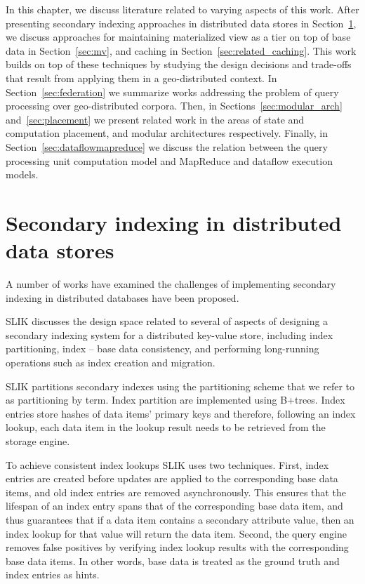 In this chapter, we discuss literature related to varying aspects of this work.
After presenting secondary indexing approaches in distributed data stores in Section~\ref{sec:secondaryindexing},
we discuss approaches for maintaining materialized view as a tier on top of base data in Section~\ref{sec:mv},
and caching in Section~\ref{sec:related_caching}.
This work builds on top of these techniques by studying the design decisions and trade-offs that result from applying
them in a geo-distributed context.
In Section~\ref{sec:federation} we summarize works addressing the problem of query processing over geo-distributed corpora.
Then, in Sections~\ref{sec:modular_arch} and~\ref{sec:placement}
we present related work in the areas of state and computation placement, and modular architectures respectively.
Finally, in Section~\ref{sec:dataflowmapreduce} we discuss the relation between the query processing unit computation model
and MapReduce and dataflow execution models.


\section{Secondary indexing in distributed data stores}
\label{sec:secondaryindexing}

A number of works \cite{kejriwal:slik, dsilva:tworings, tan:diffindex, tang:deferredindexing}
have examined the challenges of implementing secondary indexing in distributed databases have been proposed.

SLIK \cite{kejriwal:slik} discusses the design space related to several of aspects of designing a secondary indexing system
for a distributed key-value store, including index partitioning, index -- base data consistency,
and performing long-running operations such as index creation and migration.

SLIK partitions secondary indexes using the partitioning scheme that we refer to as partitioning by term.
Index partition are implemented using B+trees.
Index entries store hashes of data items' primary keys and therefore,
following an index lookup, each data item in the lookup result needs to be retrieved from the storage engine.

To achieve consistent index lookups SLIK uses two techniques.
First, index entries are created before updates are applied to the corresponding base data items,
and old index entries are removed asynchronously.
This ensures that the lifespan of an index entry spans that of the corresponding base data item,
and thus guarantees that if a data item contains a secondary attribute value, then an index lookup for that value will
return the data item.
Second, the query engine removes false positives by verifying index lookup results with the corresponding base data items.
In other words, base data is treated as the ground truth and index entries as hints.


